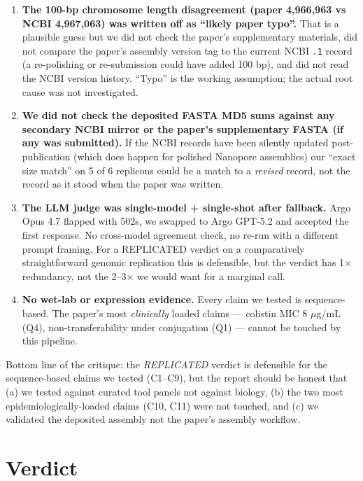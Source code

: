 \documentclass[11pt]{article}
\begin{document}
\begin{enumerate}
  \item \textbf{The 100-bp chromosome length disagreement (paper 4{,}966{,}963 vs NCBI 4{,}967{,}063) was written off as ``likely paper typo''.} That is a plausible guess but we did not check the paper's supplementary materials, did not compare the paper's assembly version tag to the current NCBI \texttt{.1} record (a re-polishing or re-submission could have added 100 bp), and did not read the NCBI version history. ``Typo'' is the working assumption; the actual root cause was not investigated.

  \item \textbf{We did not check the deposited FASTA MD5 sums against any secondary NCBI mirror or the paper's supplementary FASTA (if any was submitted).} If the NCBI records have been silently updated post-publication (which does happen for polished Nanopore assemblies) our ``exact size match'' on 5 of 6 replicons could be a match to a \emph{revised} record, not the record as it stood when the paper was written.

  \item \textbf{The LLM judge was single-model + single-shot after fallback.} Argo Opus 4.7 flapped with 502s, we swapped to Argo GPT-5.2 and accepted the first response. No cross-model agreement check, no re-run with a different prompt framing. For a REPLICATED verdict on a comparatively straightforward genomic replication this is defensible, but the verdict has 1$\times$ redundancy, not the 2--3$\times$ we would want for a marginal call.

  \item \textbf{No wet-lab or expression evidence.} Every claim we tested is sequence-based. The paper's most \emph{clinically} loaded claims --- colistin MIC 8 $\mu$g/mL (Q4), non-transferability under conjugation (Q1) --- cannot be touched by this pipeline.
\end{enumerate}

Bottom line of the critique: the \emph{REPLICATED} verdict is defensible for the sequence-based
claims we tested (C1--C9), but the report should be honest that (a) we tested against curated tool
panels not against biology, (b) the two most epidemiologically-loaded claims (C10, C11) were not
touched, and (c) we validated the deposited assembly not the paper's assembly workflow.

\section{Verdict}
\label{sec:verdict}
\end{document}
